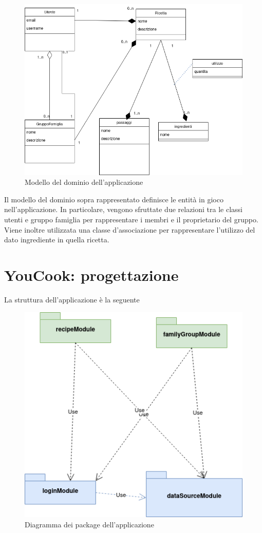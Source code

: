 \begin{figure}[H]
    \centering
 \includegraphics[scale=0.7]{resources/modello_del_dominio.drawio.png}
   \caption{Modello del dominio dell'applicazione}
\end{figure}
Il modello del dominio sopra rappresentato definisce le entità in gioco nell'applicazione. In particolare, vengono sfruttate due relazioni tra le classi utenti e gruppo famiglia per rappresentare i membri e il proprietario del gruppo. Viene inoltre utilizzata una classe d'associazione per rappresentare l'utilizzo del dato ingrediente in quella ricetta.\section{YouCook: progettazione}
La struttura dell'applicazione è la seguente
\begin{figure}[H]
    \centering
 \includegraphics[scale=0.7]{resources/diagramma_package-diagramma_package.drawio.png}
   \caption{Diagramma dei package dell'applicazione}
\end{figure}
